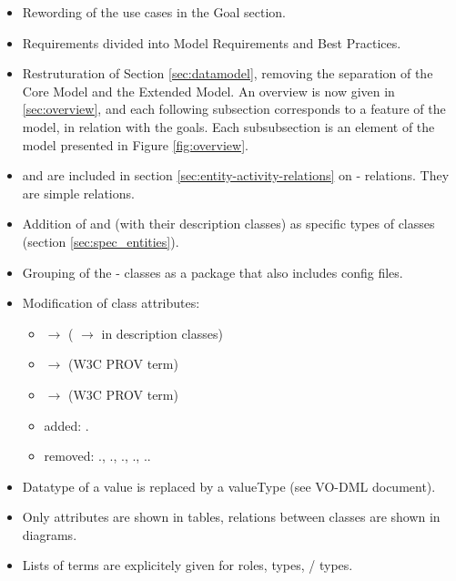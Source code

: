 \begin{itemize}
\item Rewording of the use cases in the Goal section.
\item Requirements divided into Model Requirements and Best Practices.
\item Restruturation of Section \ref{sec:datamodel}, removing the separation of the Core Model and the Extended Model. An overview is now given in \ref{sec:overview}, and each following subsection corresponds to a feature of the model, in relation with the goals. Each subsubsection is an element of the model presented in Figure \ref{fig:overview}.
\item {} and  are included in section \ref{sec:entity-activity-relations} on - relations. They are simple relations.
\item Addition of  and  (with their description classes) as specific types of  classes (section \ref{sec:spec_entities}).
\item Grouping of the - classes as a  package that also includes config files.
\item Modification of class attributes: 
\begin{itemize}
  \item {} $\rightarrow$  ( $\rightarrow$  in description classes)
  \item {} $\rightarrow$  (W3C PROV term)
  \item {} $\rightarrow$  (W3C PROV term)
  \item added: .
  \item removed: ., ., ., ., ..
\end{itemize}
\item Datatype of a value is replaced by a valueType (see VO-DML document).
\item Only attributes are shown in tables, relations between classes are shown in diagrams.
\item Lists of terms are explicitely given for  roles,  types, / types.

\end{itemize}
